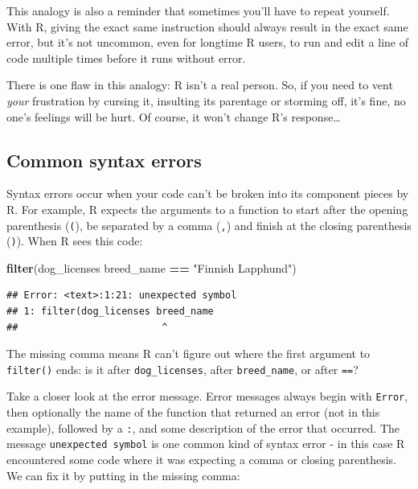 \documentclass[]{Nemilov}
\newenvironment{Shaded}{\begin{snugshade}}{\end{snugshade}}
\newcommand{\KeywordTok}[1]{\textcolor[rgb]{0.13,0.29,0.53}{\textbf{#1}}}
\newcommand{\NormalTok}[1]{#1}
\newcommand{\OperatorTok}[1]{\textcolor[rgb]{0.81,0.36,0.00}{\textbf{#1}}}
\newcommand{\StringTok}[1]{\textcolor[rgb]{0.31,0.60,0.02}{#1}}
\begin{document}
This analogy is also a reminder that sometimes you'll have to repeat yourself. With R, giving the exact same instruction should always result in the exact same error, but it's not uncommon, even for longtime R users, to run and edit a line of code multiple times before it runs without error.

There is one flaw in this analogy: R isn't a real person. So, if you need to vent \emph{your} frustration by cursing it, insulting its parentage or storming off, it's fine, no one's feelings will be hurt. Of course, it won't change R's response\ldots{}

\hypertarget{common-syntax-errors}{%
\subsection{Common syntax errors}\label{common-syntax-errors}}

Syntax errors occur when your code can't be broken into its component pieces by R. For example, R expects the arguments to a function to start after the opening parenthesis (\texttt{(}), be separated by a comma (\texttt{,}) and finish at the closing parenthesis (\texttt{)}). When R sees this code:

\begin{Shaded}
\begin{Highlighting}[]
\KeywordTok{filter}\NormalTok{(dog_licenses breed_name }\OperatorTok{==}\StringTok{ "Finnish Lapphund"}\NormalTok{)}
\end{Highlighting}
\end{Shaded}

\begin{verbatim}
## Error: <text>:1:21: unexpected symbol
## 1: filter(dog_licenses breed_name
##                         ^
\end{verbatim}

The missing comma means R can't figure out where the first argument to \texttt{filter()} ends: is it after \texttt{dog\_licenses}, after \texttt{breed\_name}, or after \texttt{==}?

Take a closer look at the error message. Error messages always begin with \texttt{Error}, then optionally the name of the function that returned an error (not in this example), followed by a \texttt{:}, and some description of the error that occurred. The message \texttt{unexpected\ symbol} is one common kind of syntax error - in this case R encountered some code where it was expecting a comma or closing parenthesis. We can fix it by putting in the missing comma:
\end{document}
